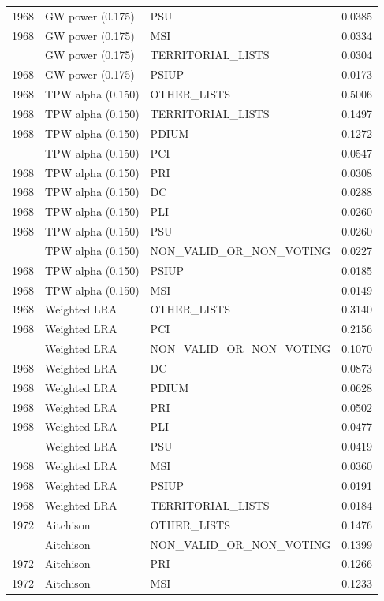 \begin{longtable}[t]{rllr}
1968 & GW power (0.175) & PSU & 0.0385\\
1968 & GW power (0.175) & MSI & 0.0334\\
\addlinespace
1968 & GW power (0.175) & TERRITORIAL\_LISTS & 0.0304\\
1968 & GW power (0.175) & PSIUP & 0.0173\\
1968 & TPW alpha (0.150) & OTHER\_LISTS & 0.5006\\
1968 & TPW alpha (0.150) & TERRITORIAL\_LISTS & 0.1497\\
1968 & TPW alpha (0.150) & PDIUM & 0.1272\\
\addlinespace
1968 & TPW alpha (0.150) & PCI & 0.0547\\
1968 & TPW alpha (0.150) & PRI & 0.0308\\
1968 & TPW alpha (0.150) & DC & 0.0288\\
1968 & TPW alpha (0.150) & PLI & 0.0260\\
1968 & TPW alpha (0.150) & PSU & 0.0260\\
\addlinespace
1968 & TPW alpha (0.150) & NON\_VALID\_OR\_NON\_VOTING & 0.0227\\
1968 & TPW alpha (0.150) & PSIUP & 0.0185\\
1968 & TPW alpha (0.150) & MSI & 0.0149\\
1968 & Weighted LRA & OTHER\_LISTS & 0.3140\\
1968 & Weighted LRA & PCI & 0.2156\\
\addlinespace
1968 & Weighted LRA & NON\_VALID\_OR\_NON\_VOTING & 0.1070\\
1968 & Weighted LRA & DC & 0.0873\\
1968 & Weighted LRA & PDIUM & 0.0628\\
1968 & Weighted LRA & PRI & 0.0502\\
1968 & Weighted LRA & PLI & 0.0477\\
\addlinespace
1968 & Weighted LRA & PSU & 0.0419\\
1968 & Weighted LRA & MSI & 0.0360\\
1968 & Weighted LRA & PSIUP & 0.0191\\
1968 & Weighted LRA & TERRITORIAL\_LISTS & 0.0184\\
1972 & Aitchison & OTHER\_LISTS & 0.1476\\
\addlinespace
1972 & Aitchison & NON\_VALID\_OR\_NON\_VOTING & 0.1399\\
1972 & Aitchison & PRI & 0.1266\\
1972 & Aitchison & MSI & 0.1233\\

\end{longtable}
